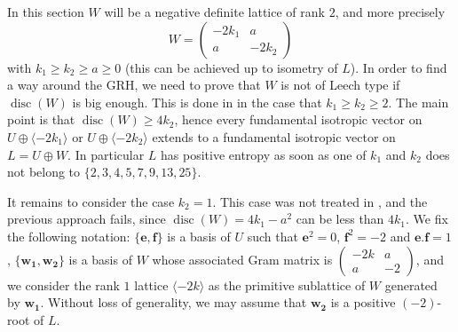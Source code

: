 \documentclass[11pt,letterpaper]{amsart}
\newcommand{\vect}[1]{\boldsymbol{#1}}
\DeclareMathOperator{\disc}{disc}
\begin{document}
In this section $W$ will be a negative definite lattice of rank $2$, and more precisely
$$
W=\begin{pmatrix}
-2k_1 &a\\
a &-2k_2
\end{pmatrix}
$$
with $k_1\ge k_2\ge a\ge 0$ (this can be achieved up to isometry of $L$). In order to find a way around the GRH, we need to prove that $W$ is not of Leech type if $\disc(W)$ is big enough. This is done in \cite[Theorem~6.1]{mezzedimi.entropy} in the case that $k_1\ge k_2\ge 2$. The main point is that $\disc(W)\ge 4k_2$, hence every fundamental isotropic vector on $U\oplus \langle -2k_1\rangle$ or $U\oplus \langle -2k_2\rangle$ extends to a fundamental isotropic vector on $L=U\oplus W$. In particular $L$ has positive entropy as soon as one of $k_1$ and $k_2$ does not belong to $\{2,3,4,5,7,9,13,25\}$.

It remains to consider the case $k_2=1$. This case was not treated in \cite{mezzedimi.entropy}, and the previous approach fails, since $\disc(W)=4k_1-a^2$ can be less than $4k_1$.
We fix the following notation: $\{\vect{e},\vect{f}\}$ is a basis of $U$ such that $\vect{e}^2=0$, $\vect{f}^2=-2$ and $\vect{e}.\vect{f}=1$, $\{\vect{w_1},\vect{w_2}\}$ is a basis of $W$ whose associated Gram matrix is $\begin{pmatrix}
-2k &a\\
a &-2
\end{pmatrix}$, and we consider the rank $1$ lattice $\langle -2k\rangle$ as the primitive sublattice of $W$ generated by $\vect{w_1}$. Without loss of generality, we may assume that $\vect{w_2}$ is a positive $(-2)$-root of $L$.
\end{document}
